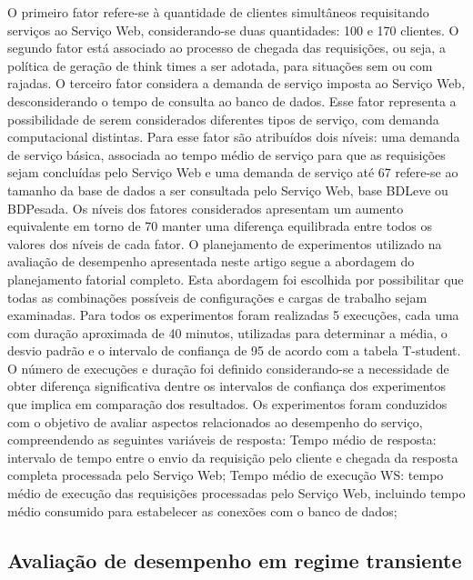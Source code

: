 O primeiro fator refere-se à quantidade de clientes simultâneos requisitando serviços ao
Serviço Web, considerando-se duas quantidades: 100 e 170 clientes. O segundo fator
está associado ao processo de chegada das requisições, ou seja, a política de geração de
think times a ser adotada, para situações sem ou com rajadas. O terceiro fator considera
a demanda de serviço imposta ao Serviço Web, desconsiderando o tempo de consulta ao
banco de dados. Esse fator representa a possibilidade de serem considerados diferentes
tipos de serviço, com demanda computacional distintas. Para esse fator são atribuídos
dois níveis: uma demanda de serviço básica, associada ao tempo médio de serviço para
que as requisições sejam concluídas pelo Serviço Web e uma demanda de serviço até
67%
refere-se ao tamanho da base de dados a ser consultada pelo Serviço Web, base BDLeve
ou BDPesada. Os níveis dos fatores considerados apresentam um aumento equivalente em
torno de 70%
manter uma diferença equilibrada entre todos os valores dos níveis de cada fator.
O planejamento de experimentos utilizado na avaliação de desempenho
apresentada neste artigo segue a abordagem do planejamento fatorial completo. Esta
abordagem foi escolhida por possibilitar que todas as combinações possíveis de
configurações e cargas de trabalho sejam examinadas. Para todos os experimentos
foram realizadas 5 execuções, cada uma com duração aproximada de 40 minutos,
utilizadas para determinar a média, o desvio padrão e o intervalo de confiança de 95%
de acordo com a tabela T-student. O número de execuções e duração foi definido
considerando-se a necessidade de obter diferença significativa dentre os intervalos de
confiança dos experimentos que implica em comparação dos resultados. Os
experimentos foram conduzidos com o objetivo de avaliar aspectos relacionados ao
desempenho do serviço, compreendendo as seguintes variáveis de resposta:
Tempo médio de resposta: intervalo de tempo entre o envio da requisição pelo
cliente e chegada da resposta completa processada pelo Serviço Web;
Tempo médio de execução WS: tempo médio de execução das requisições
processadas pelo Serviço Web, incluindo tempo médio consumido para estabelecer
as conexões com o banco de dados; 

\subsection{Avaliação de desempenho em regime transiente}





